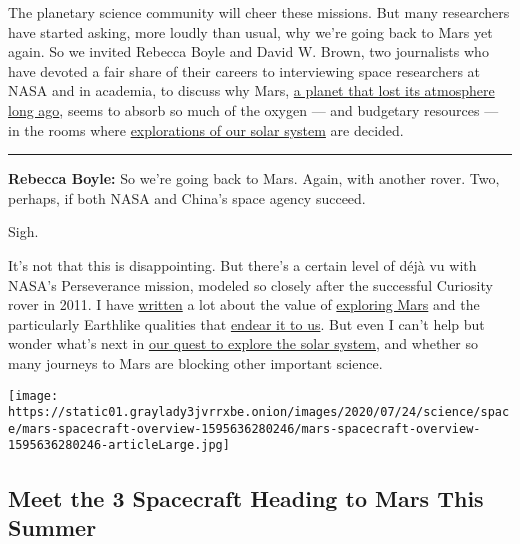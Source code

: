 The planetary science community will cheer these missions. But many
researchers have started asking, more loudly than usual, why we're going
back to Mars yet again. So we invited Rebecca Boyle and David W. Brown,
two journalists who have devoted a fair share of their careers to
interviewing space researchers at NASA and in academia, to discuss why
Mars,
\href{https://www.nytimes3xbfgragh.onion/2020/07/24/science/mars-life-water.html}{a
planet that lost its atmosphere long ago}, seems to absorb so much of
the oxygen --- and budgetary resources --- in the rooms where
\href{https://www.nytimes3xbfgragh.onion/interactive/2020/science/exploring-the-solar-system.html}{explorations
of our solar system} are decided.

\begin{center}\rule{0.5\linewidth}{\linethickness}\end{center}

\textbf{Rebecca Boyle:} So we're going back to Mars. Again, with another
rover. Two, perhaps, if both NASA and China's space agency succeed.

Sigh.

It's not that this is disappointing. But there's a certain level of déjà
vu with NASA's Perseverance mission, modeled so closely after the
successful Curiosity rover in 2011. I have
\href{https://www.scientificamerican.com/article/lost-opportunity-after-a-15-year-odyssey-nasas-trailblazing-mars-rover-approaches-its-end/}{written}
a lot about the value of
\href{https://fivethirtyeight.com/features/everything-about-mars-is-the-worst/}{exploring
Mars} and the particularly Earthlike qualities that
\href{https://www.theatlantic.com/science/archive/2017/01/mars-is-the-best-planet/512654/}{endear
it to us}. But even I can't help but wonder what's next in
\href{https://www.nytimes3xbfgragh.onion/interactive/2020/science/exploring-the-solar-system.html}{our
quest to explore the solar system}, and whether so many journeys to Mars
are blocking other important science.

\href{https://www.nytimes3xbfgragh.onion/interactive/2020/science/mars-perseverance-tianwen-hope.html}{}

\texttt{[image: https://static01.graylady3jvrrxbe.onion/images/2020/07/24/science/space/mars-spacecraft-overview-1595636280246/mars-spacecraft-overview-1595636280246-articleLarge.jpg]}

\hypertarget{meet-the-3-spacecraft-heading-to-mars-this-summer}{%
\subsection{Meet the 3 Spacecraft Heading to Mars This
Summer}\label{meet-the-3-spacecraft-heading-to-mars-this-summer}}

